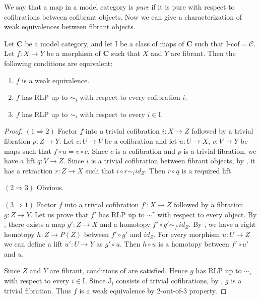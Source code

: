 \documentclass{amsart}
\theoremstyle{definition}
\newcommand{\cof}{\mathcal{C}}
\newcommand{\cat}[1]{\mathbf{#1}}
\newcommand{\C}{\cat{C}}
\newcommand{\I}{\mathrm{I}}
\newcommand{\J}{\mathrm{J}}
\newcommand{\class}[2]{#1\text{-}\mathrm{#2}}
\newcommand{\Icof}[1][\I]{\class{#1}{cof}}
\begin{document}
We say that a map in a model category is \emph{pure} if it is pure with respect to cofibrations between cofibrant objects.
Now we can give a characterization of weak equivalences between fibrant objects.

\begin{prop}[min-we]
Let $\C$ be a model category, and let $\I$ be a class of maps of $\C$ such that $\Icof = \cof$.
Let $f : X \to Y$ be a morphism of $\C$ such that $X$ and $Y$ are fibrant.
Then the following conditions are equivalent:
\begin{enumerate}
\item $f$ is a weak equivalence.
\item $f$ has RLP up to $\sim_i$ with respect to every cofibration $i$.
\item $f$ has RLP up to $\sim_i$ with respect to every $i \in \I$.
\end{enumerate}
\end{prop}
\begin{proof}
$(1 \Rightarrow 2)$
Factor $f$ into a trivial cofibration $i : X \to Z$ followed by a trivial fibration $p : Z \to Y$.
Let $c : U \to V$ be a cofibration and let $u : U \to X$, $v : V \to Y$ be maps such that $f \circ u = v \circ c$.
Since $c$ is a cofibration and $p$ is a trivial fibration, we have a lift $q : V \to Z$.
Since $i$ is a trivial cofibration between fibrant objects, by , it has a retraction $r : Z \to X$ such that $i \circ r \sim_i id_Z$.
Then $r \circ q$ is a required lift.

$(2 \Rightarrow 3)$ Obvious.

$(3 \Rightarrow 1)$
Factor $f$ into a trivial cofibration $f' : X \to Z$ followed by a fibration $g : Z \to Y$.
Let us prove that $f'$ has RLP up to $\sim^r$ with respect to every object.
By , there exists a map $g' : Z \to X$ and a homotopy $f' \circ g' \sim_{f'} id_Z$.
By , we have a right homotopy $h : Z \to P(Z)$ between $f' \circ g'$ and $id_Z$.
For every morphism $u : U \to Z$ we can define a lift $u' : U \to Y$ as $g' \circ u$.
Then $h \circ u$ is a homotopy between $f' \circ u'$ and $u$.

Since $Z$ and $Y$ are fibrant, conditions of  are satisfied.
Hence $g$ has RLP up to $\sim_i$ with respect to every $i \in \I$.
Since $\J_\I$ consists of trivial cofibrations, by , $g$ is a trivial fibration.
Thus $f$ is a weak equivalence by 2-out-of-3 property.
\end{proof}
\end{document}
